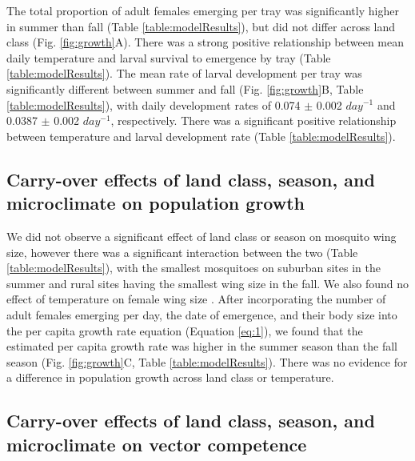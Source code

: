 \documentclass[12pt]{article}
\begin{document}
The total proportion of adult females emerging per tray was significantly higher in summer than fall (Table \ref{table:modelResults}), but did not differ across land class (Fig. \ref{fig:growth}A). There was a strong positive relationship between mean daily temperature and larval survival to emergence by tray (Table \ref{table:modelResults}). The mean rate of larval development per tray was significantly different between summer and fall (Fig. \ref{fig:growth}B, Table \ref{table:modelResults}), with daily development rates of 0.074 $\pm$ 0.002 $day^{-1}$ and 0.0387 $\pm$ 0.002 $day^{-1}$, respectively. There was a significant positive relationship between temperature and larval development rate (Table \ref{table:modelResults}).

\subsection{Carry-over effects of land class, season, and microclimate on population growth}

We did not observe a significant effect of land class or season on mosquito wing size, however there was a significant interaction between the two (Table \ref{table:modelResults}), with the smallest mosquitoes on suburban sites in the summer and rural sites having the smallest wing size in the fall. We also found no effect of temperature on female wing size . After incorporating the number of adult females emerging per day, the date of emergence, and their body size into the per capita growth rate equation (Equation \ref{eq:1}), we found that the estimated per capita growth rate was higher in the summer season than the fall season (Fig. \ref{fig:growth}C, Table \ref{table:modelResults}). There was no evidence for a difference in population growth across land class or temperature.

\subsection{Carry-over effects of land class, season, and microclimate on vector competence}
\end{document}
